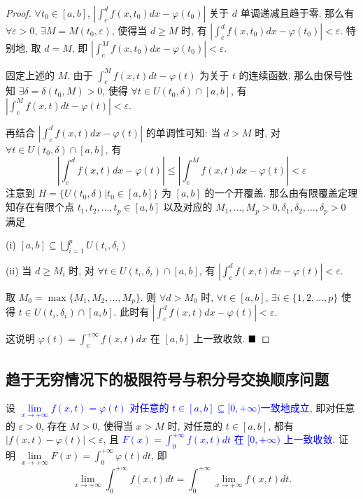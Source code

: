 \documentclass[lang=cn,newtx,10pt,scheme=chinese]{elegantbook}
\begin{document}
\begin{proof}
$\forall t_0 \in [a, b]$, $|\int_{c}^{d} f(x, t_0) dx - \varphi(t_0)|$ 关于 $d$ 单调递减且趋于零. 那么有 $\forall \varepsilon > 0$, $\exists M = M(t_0, \varepsilon)$, 使得当 $d \ge M$ 时, 有 $|\int_{c}^{d} f(x, t_0) dx - \varphi(t_0)| < \varepsilon$. 特别地, 取 $d=M$, 即 $|\int_{c}^{M} f(x, t_0) dx - \varphi(t_0)| < \varepsilon$.

固定上述的 $M$. 由于 $ \int_{c}^{M} f(x, t) dt - \varphi(t) $ 为关于 $t$ 的连续函数, 那么由保号性知 $\exists \delta = \delta(t_0, M) > 0$, 使得 $\forall t \in U(t_0, \delta) \cap [a, b]$, 有 $|\int_{c}^{M} f(x, t) dt - \varphi(t)| < \varepsilon$.

再结合 $| \int_{c}^{d} f(x, t) dx - \varphi(t) |$ 的单调性可知: 当 $d>M$ 时, 对 $\forall t \in U(t_0, \delta) \cap [a, b]$, 有
$$ |\int_{c}^{d} f(x, t) dx - \varphi(t)| \le |\int_{c}^{M} f(x, t) dx - \varphi(t)| < \varepsilon $$
注意到 $H = \{U(t_0, \delta) | t_0 \in [a, b]\}$ 为 $[a, b]$ 的一个开覆盖. 那么由有限覆盖定理知存在有限个点 $t_1, t_2, \dots, t_p \in [a, b]$ 以及对应的 $M_1, \dots, M_p > 0, \delta_1, \delta_2, \dots, \delta_p > 0$ 满足

(i) $[a, b] \subseteq \bigcup_{i=1}^{p} U(t_i, \delta_i)$

(ii) 当 $d \ge M_i$ 时, 对 $\forall t \in U(t_i, \delta_i) \cap [a, b]$, 有 $|\int_{c}^{d} f(x, t) dx - \varphi(t)| < \varepsilon$.

取 $M_0 = \max\{M_1, M_2, \dots, M_p\}$. 则 $\forall d > M_0$ 时, $\forall t \in [a, b]$, $\exists i \in \{1, 2, \dots, p\}$ 使得 $t \in U(t_i, \delta_i) \cap [a, b]$. 此时有 $|\int_{c}^{d} f(x, t) dx - \varphi(t)| < \varepsilon$.

这说明 $\varphi(t) = \int_{c}^{+\infty} f(x, t) dx$ 在 $[a, b]$ 上一致收敛.
$\hfill \blacksquare$
\end{proof}


\subsection{趋于无穷情况下的极限符号与积分号交换顺序问题}

\begin{proposition}
设 \textcolor{blue}{$\lim\limits_{x \to +\infty} f(x, t) = \varphi(t)$ 对任意的 $t \in [a, b] \subseteq [0, +\infty)$一致地成立}, 即对任意的 $\varepsilon > 0$, 存在 $M>0$, 使得当 $x>M$ 时, 对任意的 $t \in [a, b]$, 都有 $|f(x, t) - \varphi(t)| < \varepsilon$, 且\textcolor{blue}{ $F(x) = \int_{0}^{+\infty} f(x, t) dt$ 在 $[0, +\infty)$ 上一致收敛}. 证明 $\lim\limits_{x \to +\infty} F(x) = \int_{0}^{+\infty} \varphi(t) dt$, 即
$$ \lim\limits_{x \to +\infty} \int_{0}^{+\infty} f(x, t) dt = \int_{0}^{+\infty} \lim\limits_{x \to +\infty} f(x, t) dt. $$
\end{proposition}
\end{document}
